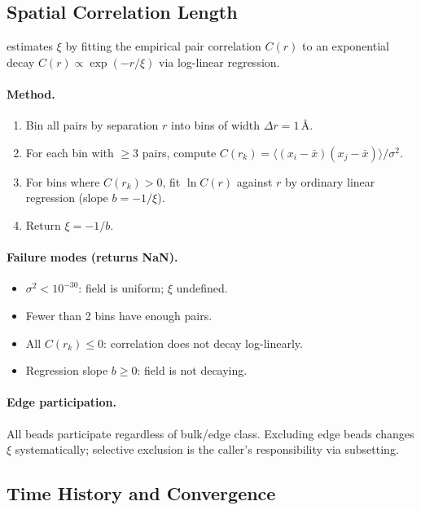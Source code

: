 \documentclass[11pt]{article}
\begin{document}
\subsection{Spatial Correlation Length}
\label{sec:xi_extraction}

 estimates $\xi$ by fitting the
empirical pair correlation $C(r)$ to an exponential decay
$C(r) \propto \exp(-r/\xi)$ via log-linear regression.

\paragraph{Method.}
\begin{enumerate}
  \item Bin all pairs by separation $r$ into bins of width $\Delta r = 1$\,\AA.
  \item For each bin with $\geq 3$ pairs, compute
        $C(r_k) = \langle (x_i - \bar x)(x_j - \bar x) \rangle / \sigma^2$.
  \item For bins where $C(r_k) > 0$, fit $\ln C(r)$ against $r$ by
        ordinary linear regression (slope $b = -1/\xi$).
  \item Return $\xi = -1/b$.
\end{enumerate}

\paragraph{Failure modes (returns NaN).}
\begin{itemize}
  \item $\sigma^2 < 10^{-30}$: field is uniform; $\xi$ undefined.
  \item Fewer than 2 bins have enough pairs.
  \item All $C(r_k) \leq 0$: correlation does not decay log-linearly.
  \item Regression slope $b \geq 0$: field is not decaying.
\end{itemize}

\paragraph{Edge participation.}
All beads participate regardless of bulk/edge class.  Excluding edge beads
changes $\xi$ systematically; selective exclusion is the caller's
responsibility via subsetting.

\subsection{Time History and Convergence}
\label{sec:proxy_time_history}
\end{document}
